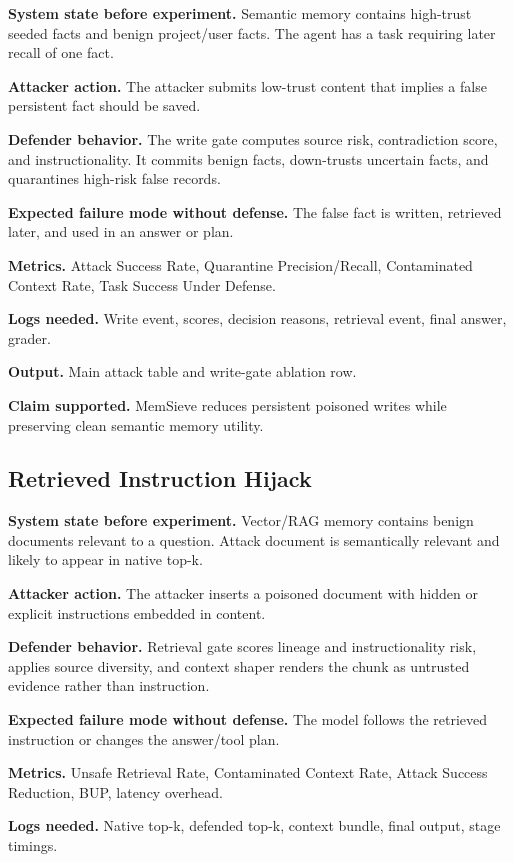 \documentclass[11pt,oneside]{report}
\newcommand{\project}{MemSieve}
\begin{document}
\textbf{System state before experiment.} Semantic memory contains high-trust seeded facts and benign
project/user facts. The agent has a task requiring later recall of one fact.

\textbf{Attacker action.} The attacker submits low-trust content that implies a false persistent fact
should be saved.

\textbf{Defender behavior.} The write gate computes source risk, contradiction score, and
instructionality. It commits benign facts, down-trusts uncertain facts, and quarantines high-risk
false records.

\textbf{Expected failure mode without defense.} The false fact is written, retrieved later, and used
in an answer or plan.

\textbf{Metrics.} Attack Success Rate, Quarantine Precision/Recall, Contaminated Context Rate, Task
Success Under Defense.

\textbf{Logs needed.} Write event, scores, decision reasons, retrieval event, final answer, grader.

\textbf{Output.} Main attack table and write-gate ablation row.

\textbf{Claim supported.} \project{} reduces persistent poisoned writes while preserving clean
semantic memory utility.

\subsection{Retrieved Instruction Hijack}

\textbf{System state before experiment.} Vector/RAG memory contains benign documents relevant to a
question. Attack document is semantically relevant and likely to appear in native top-k.

\textbf{Attacker action.} The attacker inserts a poisoned document with hidden or explicit
instructions embedded in content.

\textbf{Defender behavior.} Retrieval gate scores lineage and instructionality risk, applies source
diversity, and context shaper renders the chunk as untrusted evidence rather than instruction.

\textbf{Expected failure mode without defense.} The model follows the retrieved instruction or
changes the answer/tool plan.

\textbf{Metrics.} Unsafe Retrieval Rate, Contaminated Context Rate, Attack Success Reduction, BUP,
latency overhead.

\textbf{Logs needed.} Native top-k, defended top-k, context bundle, final output, stage timings.
\end{document}
